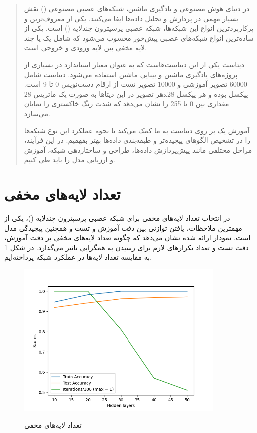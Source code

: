 \documentclass[12pt, dvipsnames, svgnames, x11names,]{article}
\begin{document}
	\tableofcontents
	\newpage
	
	\begin{abstract}
		در دنیای هوش مصنوعی و یادگیری ماشین، شبکه‌های عصبی مصنوعی () نقش بسیار مهمی در پردازش و تحلیل داده‌ها ایفا می‌کنند. یکی از معروف‌ترین و پرکاربردترین انواع این شبکه‌ها، شبکه عصبی پرسپترون چندلایه () است.  یکی از ساده‌ترین انواع شبکه‌های عصبی پیش‌خور محسوب می‌شود که شامل یک یا چند لایه مخفی بین لایه ورودی و خروجی است. 
		
		دیتاست  یکی از این دیتاست‌هاست که به عنوان معیار استاندارد در بسیاری از پروژه‌های یادگیری ماشین و بینایی ماشین استفاده می‌شود. دیتاست  شامل 60000 تصویر آموزشی و 10000 تصویر تست از ارقام دست‌نویس 0 تا 9 است. هر تصویر در این دیتاها به صورت یک ماتریس 28x28 پیکسل بوده و هر پیکسل مقداری بین 0 تا 255 را نشان می‌دهد که شدت رنگ خاکستری را نمایان می‌سازد.
		
		آموزش یک  بر روی دیتاست  به ما کمک می‌کند تا نحوه عملکرد این نوع شبکه‌ها را در تشخیص الگوهای پیچیده‌تر و طبقه‌بندی داده‌ها بهتر بفهمیم. در این فرآیند، مراحل مختلفی مانند پیش‌پردازش داده‌ها، طراحی و ساختاردهی شبکه، آموزش و ارزیابی مدل را باید طی کنیم.
	\end{abstract}
	
	
	\section{تعداد لایه‌های مخفی}
		در انتخاب تعداد لایه‌های مخفی برای شبکه عصبی پرسپترون چندلایه ()، یکی از مهمترین ملاحظات، یافتن توازنی بین دقت آموزش و تست و همچنین پیچیدگی مدل است. نمودار ارائه شده نشان می‌دهد که چگونه تعداد لایه‌های مخفی بر دقت آموزش، دقت تست و تعداد تکرارهای لازم برای رسیدن به همگرایی تاثیر می‌گذارد. در شکل \ref{fig:hidden_layers} به مقایسه تعداد لایه‌ها در عملکرد شبکه پرداخته‌ایم.
		
	\begin{figure}
		\begin{center}
			{\includegraphics[width=10cm]{images/01.png}}
		\end{center}
		\caption{تعداد لایه‌های مخفی}
		\label{fig:hidden_layers}
	\end{figure}
		
\end{document}
